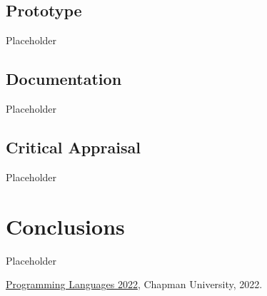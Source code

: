 \documentclass{article}
\theoremstyle{theorem}
\theoremstyle{definition}
\theoremstyle{remark}
\begin{document}
\subsection{Prototype}

Placeholder

\subsection{Documentation}

Placeholder

\subsection{Critical Appraisal}

Placeholder

\section{Conclusions}\label{conclusions}

Placeholder

\begin{thebibliography}{99}
 \href{https://github.com/alexhkurz/programming-languages-2022/blob/main/README.md}{Programming Languages 2022}, Chapman University, 2022.
\end{thebibliography}
\end{document}
